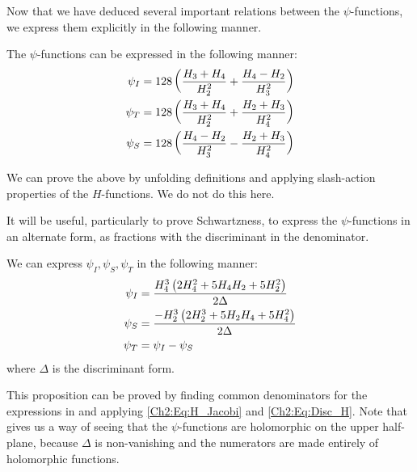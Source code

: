 Now that we have deduced several important relations between the $\psi$-functions, we express them explicitly in the following manner.

\begin{boxlemma}\label{Ch4:Lemma:psi_explicitly}
    The $\psi$-functions can be expressed in the following manner:
    \begin{align*}
        \psi_I &= 128 \left( \frac{H_3 + H_4}{H_2^2} + \frac{H_4 - H_2}{H_3^2} \right) \\
        \psi_T &= 128 \left( \frac{H_3 + H_4}{H_2^2} + \frac{H_2 + H_3}{H_4^2} \right) \\
        \psi_S &= 128 \left( \frac{H_4 - H_2}{H_3^2} - \frac{H_2 + H_3}{H_4^2} \right)
    \end{align*}
\end{boxlemma}

We can prove the above by unfolding definitions and applying slash-action properties of the $H$-functions. We do not do this here.

It will be useful, particularly to prove Schwartzness, to express the $\psi$-functions in an alternate form, as fractions with the discriminant in the denominator.

\begin{boxproposition}\label{Ch4:Prop:psi_as_div_disc}
    We can express $\psi_I, \psi_S, \psi_T$ in the following manner:
    \begin{align}
        \psi_I &= \frac{H_4^3\left( 2 H_4^2 + 5 H_4 H_2 + 5 H_2^2 \right)}{2 \Delta}
            \label{Ch4:Eq:psi_I_def} \\
        \psi_S &= \frac{- H_2^3 \left( 2 H_2^3 + 5 H_2 H_4 + 5 H_4^2 \right)}{2 \Delta}
            \label{Ch4:Eq:psi_S_def} \\
        \psi_T &= \psi_I - \psi_S
            \label{Ch4:Eq:psi_T_def}
    \end{align}
    where $\Delta$ is the discriminant form.
\end{boxproposition}

This proposition can be proved by finding common denominators for the expressions in  and applying \eqref{Ch2:Eq:H_Jacobi} and \eqref{Ch2:Eq:Disc_H}. Note that  gives us a way of seeing that the $\psi$-functions are holomorphic on the upper half-plane, because $\Delta$ is non-vanishing and the numerators are made entirely of holomorphic functions.

